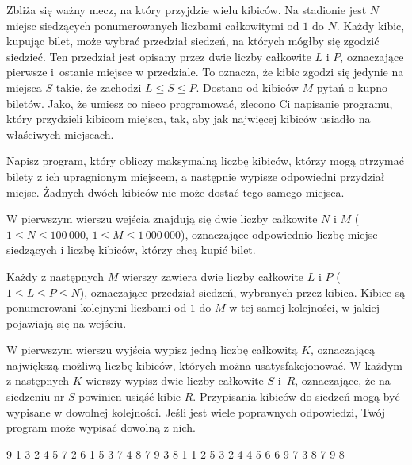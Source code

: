 

\usepackage[utf8]{inputenc}
\usepackage[T1]{fontenc}
\usepackage[polish]{babel}
\usepackage{polski}





Zbliża się ważny mecz, na który przyjdzie wielu kibiców.
Na stadionie jest $N$ miejsc siedzących ponumerowanych liczbami całkowitymi od $1$ do $N$.
Każdy kibic, kupując bilet, może wybrać przedział siedzeń, na których mógłby się zgodzić siedzieć.
Ten przedział jest opisany przez dwie liczby całkowite $L$ i $P$, oznaczające pierwsze i~ostanie miejsce w przedziale.
To oznacza, że kibic zgodzi się jedynie na miejsca $S$ takie, że zachodzi $L \le S \le P$.
Dostano od kibiców $M$ pytań o kupno biletów.
Jako, że umiesz co nieco programować, zlecono Ci napisanie programu, który przydzieli kibicom miejsca,
	tak, aby jak najwięcej kibiców usiadło na właściwych miejscach.


Napisz program, który obliczy maksymalną liczbę kibiców, którzy mogą otrzymać bilety z ich upragnionym miejscem,
	a następnie wypisze odpowiedni przydział miejsc.
Żadnych dwóch kibiców nie może dostać tego samego miejsca.


W pierwszym wierszu wejścia znajdują się dwie liczby całkowite $N$ i $M$ ($1 \le N \le 100\,000$, $1 \le M \le 1\,000\,000$),
	oznaczające odpowiednio liczbę miejsc siedzących i liczbę kibiców, którzy chcą kupić bilet.

Każdy z następnych $M$ wierszy zawiera dwie liczby całkowite $L$ i $P$ ($1 \le L \le P \le N$),
	oznaczające przedział siedzeń, wybranych przez kibica.
Kibice są ponumerowani kolejnymi liczbami od $1$ do $M$ w tej samej kolejności, w jakiej pojawiają się na wejściu.


W pierwszym wierszu wyjścia wypisz jedną liczbę całkowitą $K$, oznaczającą największą możliwą liczbę kibiców,
	których można usatysfakcjonować.
W każdym z następnych $K$ wierszy wypisz dwie liczby całkowite $S$ i~$R$, oznaczające, że na siedzeniu
	nr $S$ powinien usiąść kibic $R$.
Przypisania kibiców do siedzeń mogą być wypisane w dowolnej kolejności.
Jeśli jest wiele poprawnych odpowiedzi, Twój program może wypisać dowolną z nich.


 9
1 3
2 4
5 7
2 6
1 5
3 7
4 8
7 9
3 8
1 1
2 5
3 2
4 4
5 6
6 9
7 3
8 7
9 8
\sampleEND


